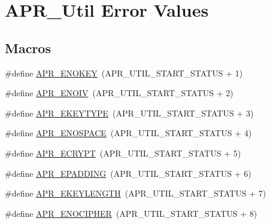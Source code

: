 \hypertarget{group___a_p_r___util___error}{\section{A\-P\-R\-\_\-\-Util Error Values}
\label{group___a_p_r___util___error}
}
\subsection*{Macros}
\begin{DoxyCompactItemize}
\item 
\#define \hyperlink{group___a_p_r___util___error_gabf9bbd463ebcf38611f6acd423e49de9}{A\-P\-R\-\_\-\-E\-N\-O\-K\-E\-Y}~(A\-P\-R\-\_\-\-U\-T\-I\-L\-\_\-\-S\-T\-A\-R\-T\-\_\-\-S\-T\-A\-T\-U\-S + 1)
\item 
\#define \hyperlink{group___a_p_r___util___error_ga2df3db3a80a6e153134caf5d3a62a00f}{A\-P\-R\-\_\-\-E\-N\-O\-I\-V}~(A\-P\-R\-\_\-\-U\-T\-I\-L\-\_\-\-S\-T\-A\-R\-T\-\_\-\-S\-T\-A\-T\-U\-S + 2)
\item 
\#define \hyperlink{group___a_p_r___util___error_ga637727cdf8285d12663ddf8bb89fa048}{A\-P\-R\-\_\-\-E\-K\-E\-Y\-T\-Y\-P\-E}~(A\-P\-R\-\_\-\-U\-T\-I\-L\-\_\-\-S\-T\-A\-R\-T\-\_\-\-S\-T\-A\-T\-U\-S + 3)
\item 
\#define \hyperlink{group___a_p_r___util___error_gaec7a912cf8fe5f964ad8fbbafaff0241}{A\-P\-R\-\_\-\-E\-N\-O\-S\-P\-A\-C\-E}~(A\-P\-R\-\_\-\-U\-T\-I\-L\-\_\-\-S\-T\-A\-R\-T\-\_\-\-S\-T\-A\-T\-U\-S + 4)
\item 
\#define \hyperlink{group___a_p_r___util___error_ga2e98ff79515dfd5a21583d09c300d9bb}{A\-P\-R\-\_\-\-E\-C\-R\-Y\-P\-T}~(A\-P\-R\-\_\-\-U\-T\-I\-L\-\_\-\-S\-T\-A\-R\-T\-\_\-\-S\-T\-A\-T\-U\-S + 5)
\item 
\#define \hyperlink{group___a_p_r___util___error_gae7c077d0539cafc19917c12174ed961d}{A\-P\-R\-\_\-\-E\-P\-A\-D\-D\-I\-N\-G}~(A\-P\-R\-\_\-\-U\-T\-I\-L\-\_\-\-S\-T\-A\-R\-T\-\_\-\-S\-T\-A\-T\-U\-S + 6)
\item 
\#define \hyperlink{group___a_p_r___util___error_gabc3c0dcf5954c161df4aff0fb0ce3ae4}{A\-P\-R\-\_\-\-E\-K\-E\-Y\-L\-E\-N\-G\-T\-H}~(A\-P\-R\-\_\-\-U\-T\-I\-L\-\_\-\-S\-T\-A\-R\-T\-\_\-\-S\-T\-A\-T\-U\-S + 7)
\item 
\#define \hyperlink{group___a_p_r___util___error_ga6b546475980180206e4286e35befaf55}{A\-P\-R\-\_\-\-E\-N\-O\-C\-I\-P\-H\-E\-R}~(A\-P\-R\-\_\-\-U\-T\-I\-L\-\_\-\-S\-T\-A\-R\-T\-\_\-\-S\-T\-A\-T\-U\-S + 8)
\item 

\end{DoxyCompactItemize}
